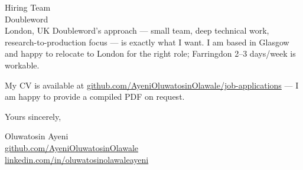 \documentclass[12pt,a4paper]{letter}
\begin{document}
\begin{letter}{Hiring Team \\ Doubleword \\ London, UK}
Doubleword's approach — small team, deep technical work, research-to-production focus — is exactly what I want. I am based in Glasgow and happy to relocate to London for the right role; Farringdon 2--3 days/week is workable.

My CV is available at \href{https://github.com/AyeniOluwatosinOlawale/job-applications/blob/master/cv/main_doubleword_inference-research.tex}{github.com/AyeniOluwatosinOlawale/job-applications} — I am happy to provide a compiled PDF on request.

\closing{Yours sincerely,}

Oluwatosin Ayeni \\
\href{https://github.com/AyeniOluwatosinOlawale}{github.com/AyeniOluwatosinOlawale} \\
\href{https://www.linkedin.com/in/oluwatosinolawaleayeni/}{linkedin.com/in/oluwatosinolawaleayeni}

\end{letter}
\end{document}
